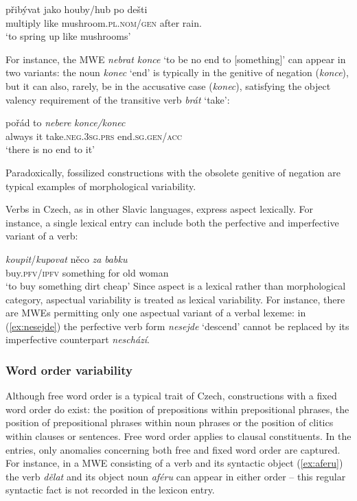 \documentclass[output=paper,colorlinks,citecolor=brown]{langscibook}
\begin{document}
\ea \label{ex:pribyvat}
 \gll přibývat jako houby/hub po dešti\\
     multiply like mushroom.\textsc{pl.nom/gen} after rain.\\
\glt `to spring up like mushrooms'
\z

\noindent
For instance, the MWE \emph{nebrat konce} ‘to be no end to [something]’ can appear in two variants: the noun \emph{konec} ‘end’ is typically in the genitive of negation (\emph{konce}), but it can also, rarely, be in the accusative case (\emph{konec}), satisfying the object valency requirement of the transitive verb \emph{brát} ‘take’:

\ea \label{ex:konec}
\gll pořád to \emph{nebere} \emph{konce/konec}\\
     always it take.\textsc{neg.3sg.prs} end.\textsc{sg.gen/acc}\\
\glt `there is no end to it'
\z

\noindent
Paradoxically, fossilized constructions with the obsolete genitive of negation are typical examples of morphological variability.

Verbs in Czech, as in other Slavic languages, express aspect lexically. For instance, a single lexical
entry can include both the perfective and imperfective variant of a verb: 


\ea \label{ex:koupit}
\gll \emph{koupit}/\emph{kupovat} něco \emph{za} \emph{babku}\\
     buy.\textsc{pfv/ipfv} something for {old woman}\\
\glt `to buy something dirt cheap'
\z
Since aspect is a lexical rather than morphological category,  aspectual variability is treated as lexical variability. For instance, there are MWEs permitting only one aspectual variant of a verbal lexeme: in (\ref{ex:nesejde}) the perfective verb form \emph{nesejde} `descend' cannot be replaced by its imperfective counterpart \emph{neschází}.

\subsubsection{Word order variability}
\label{variability-word-order}

Although free word order is a typical trait of Czech,  constructions with a fixed word order do exist: the position of prepositions within prepositional phrases, the position of prepositional phrases within noun phrases or the position of clitics within clauses or sentences. Free word order applies to clausal constituents. 
In the entries, only anomalies concerning both free and fixed word order are captured. For instance, in a MWE consisting of a verb and its syntactic object (\ref{ex:aferu}) the verb \emph{dělat} and its object noun \emph{aféru} can appear
in either order -- this regular syntactic fact is not recorded in
the lexicon entry. 
\end{document}
